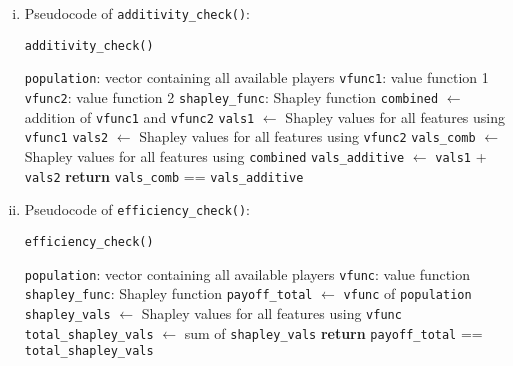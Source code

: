 {\begin{enumerate}[a)]
\begin{enumerate}[(i)]
	\item Pseudocode of \texttt{additivity\_check()}:
	
	\begin{algorithm}[H]
		\caption{\texttt{additivity\_check()}}
		\begin{algorithmic}[1]
			\Require \texttt{population}: vector containing all available players
			\Require \texttt{vfunc1}: value function 1
			\Require \texttt{vfunc2}: value function 2
			\Require \texttt{shapley\_func}: Shapley function
			\State \texttt{combined} $\gets$ addition of \texttt{vfunc1} and \texttt{vfunc2}
			\State \texttt{vals1} $\gets$ Shapley values for all features using \texttt{vfunc1}
			\State \texttt{vals2} $\gets$ Shapley values for all features using \texttt{vfunc2}
			\State \texttt{vals\_comb} $\gets$ Shapley values for all features using \texttt{combined}
			\State \texttt{vals\_additive} $\gets$ \texttt{vals1} + \texttt{vals2}
			\State \textbf{return} \texttt{vals\_comb} == \texttt{vals\_additive}
		\end{algorithmic}
	\end{algorithm}

	\item Pseudocode of \texttt{efficiency\_check()}:
	
	\begin{algorithm}[H]
		\caption{\texttt{efficiency\_check()}}
		\begin{algorithmic}[1]
			\Require \texttt{population}: vector containing all available players
			\Require \texttt{vfunc}: value function
			\Require \texttt{shapley\_func}: Shapley function
			\State \texttt{payoff\_total} $\gets$ \texttt{vfunc} of \texttt{population}
			\State \texttt{shapley\_vals} $\gets$ Shapley values for all features using \texttt{vfunc}
			\State \texttt{total\_shapley\_vals} $\gets$ sum of \texttt{shapley\_vals}
			\State \textbf{return} \texttt{payoff\_total} == \texttt{total\_shapley\_vals}
		\end{algorithmic}
	\end{algorithm}
	\end{enumerate}
\end{enumerate}


}
